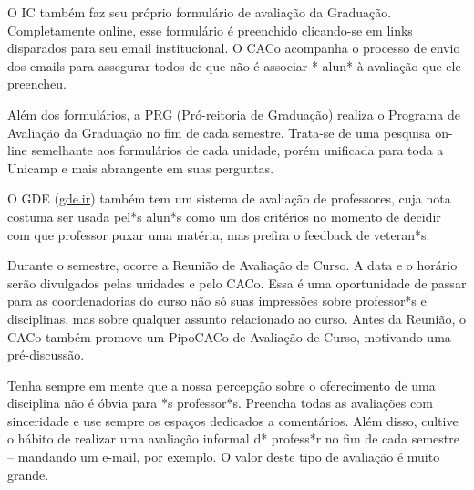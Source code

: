 O IC também faz seu próprio formulário de avaliação da Graduação. Completamente
online, esse formulário é preenchido clicando-se em links disparados para seu
email institucional. O CACo acompanha o processo de envio dos emails para
assegurar todos de que não é associar * alun* à avaliação que ele preencheu.

Além dos formulários, a PRG (Pró-reitoria de Graduação) realiza o Programa de
Avaliação da Graduação no fim de cada semestre. Trata-se de uma pesquisa
on-line semelhante aos formulários de cada unidade, porém unificada para toda a
Unicamp e mais abrangente em suas perguntas.

O GDE (\url{gde.ir}) também tem um sistema de avaliação de professores, cuja
nota costuma ser usada pel*s alun*s como um dos critérios no momento de decidir
com que professor puxar uma matéria, mas prefira o feedback de veteran*s.

Durante o semestre, ocorre a Reunião de Avaliação de Curso. A data e o horário
serão divulgados pelas unidades e pelo CACo. Essa é uma oportunidade de passar
para as coordenadorias do curso não só suas impressões sobre professor*s e
disciplinas, mas sobre qualquer assunto relacionado ao curso. Antes da Reunião,
o CACo também promove um PipoCACo de Avaliação de Curso, motivando uma
pré-discussão.

Tenha sempre em mente que a nossa percepção sobre o oferecimento de uma
disciplina não é óbvia para *s professor*s. Preencha todas as avaliações com
sinceridade e use sempre os espaços dedicados a comentários. Além disso,
cultive o hábito de realizar uma avaliação informal d* profess*r no fim de cada
semestre -- mandando um e-mail, por exemplo. O valor deste tipo de avaliação é
muito grande.
